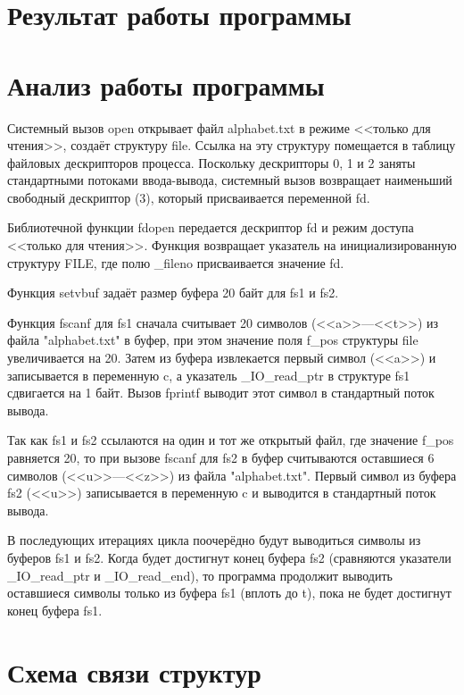 \section{Результат работы программы}


\section{Анализ работы программы}

Системный вызов open открывает файл alphabet.txt в режиме <<только для чтения>>, создаёт структуру file. Ссылка на эту структуру помещается в таблицу файловых дескрипторов процесса. Поскольку дескрипторы 0, 1 и 2 заняты стандартными потоками ввода-вывода, системный вызов возвращает наименьший свободный дескриптор (3), который присваивается переменной fd.

Библиотечной функции fdopen передается дескриптор fd и режим доступа <<только для чтения>>. Функция возвращает указатель на инициализированную структуру FILE, где полю \_fileno присваивается значение fd.

Функция setvbuf задаёт размер буфера 20 байт для fs1 и fs2.

Функция fscanf для fs1 сначала считывает 20 символов (<<a>>---<<t>>) из файла "alphabet.txt" в буфер, при этом значение поля f\_pos структуры file увеличивается на 20. Затем из буфера извлекается первый символ (<<a>>) и записывается в переменную c, а указатель \_IO\_read\_ptr в структуре fs1 сдвигается на 1 байт. Вызов fprintf выводит этот символ в стандартный поток вывода.

Так как fs1 и fs2 ссылаются на один и тот же открытый файл, где значение f\_pos равняется 20, то при вызове fscanf для fs2 в буфер считываются оставшиеся 6 символов (<<u>>---<<z>>) из файла "alphabet.txt". Первый символ из буфера fs2 (<<u>>) записывается в переменную c и выводится в стандартный поток вывода.

В последующих итерациях цикла поочерёдно будут выводиться символы из буферов fs1 и fs2.
Когда будет достигнут конец буфера fs2 (сравняются указатели \_IO\_read\_ptr и \_IO\_read\_end), то программа продолжит выводить оставшиеся символы только из буфера fs1 (вплоть до t), пока не будет достигнут конец буфера fs1.

\section{Схема связи структур}


